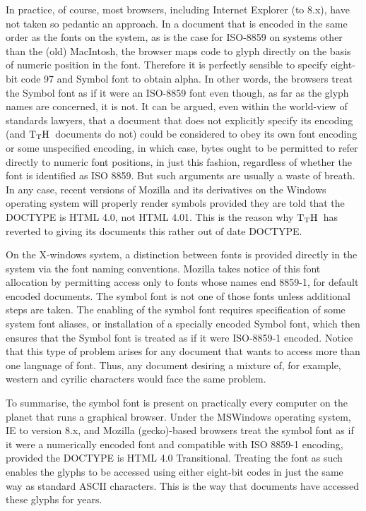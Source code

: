 \documentclass[12pt]{article}
\def\TtH{$\rm{}T_TH$}
\begin{document}
In practice, of course, most browsers, including Internet Explorer (to
8.x), have not taken so pedantic an approach. In a document that is
encoded in the same order as the fonts on the system, as is the case
for ISO-8859 on systems other than the (old) MacIntosh, the browser maps
code to glyph directly on the basis of numeric position in the
font. Therefore it is perfectly sensible to specify eight-bit code 97
and Symbol font to obtain alpha. In other words, the browsers treat
the Symbol font as if it were an ISO-8859 font even though, as far as
the glyph names are concerned, it is not. It can be argued, even
within the world-view of standards lawyers, that a document that does
not explicitly specify its encoding (and \TtH\ documents do not) could
be considered to obey its own font encoding or some unspecified
encoding, in which case, bytes ought to be permitted to refer directly
to numeric font positions, in just this fashion, regardless of whether
the font is identified as ISO 8859. But such arguments are usually a
waste of breath. In any case, recent versions of Mozilla and its
derivatives on the Windows operating system will properly render
symbols provided they are told that the DOCTYPE is HTML 4.0, not HTML
4.01. This is the reason why \TtH\ has reverted to giving its
documents this rather out of date DOCTYPE.

On the X-windows system, a distinction between fonts is provided
directly in the system via the font naming conventions. Mozilla takes
notice of this font allocation by permitting access only to fonts
whose names end 8859-1, for default encoded documents. The symbol font
is not one of those fonts unless additional steps are taken. The
enabling of the symbol font requires specification of some system font
aliases, or installation of a specially encoded Symbol font, which
then ensures that the Symbol font is treated as if it were ISO-8859-1
encoded. Notice that this type of problem arises for any document that
wants to access more than one language of font. Thus, any document
desiring a mixture of, for example, western and cyrilic characters
would face the same problem.

To summarise, the symbol font is present on practically every computer
on the planet that runs a graphical browser. Under the MSWindows
operating system, IE to version 8.x, and Mozilla (gecko)-based
browsers treat the symbol font as if it were a numerically encoded
font and compatible with ISO 8859-1 encoding, provided the DOCTYPE is
HTML 4.0 Transitional.  Treating the font as such enables the glyphs to be
accessed using either eight-bit codes in just the same way as standard
ASCII characters. This is the way that documents have accessed these
glyphs for years.
\end{document}
